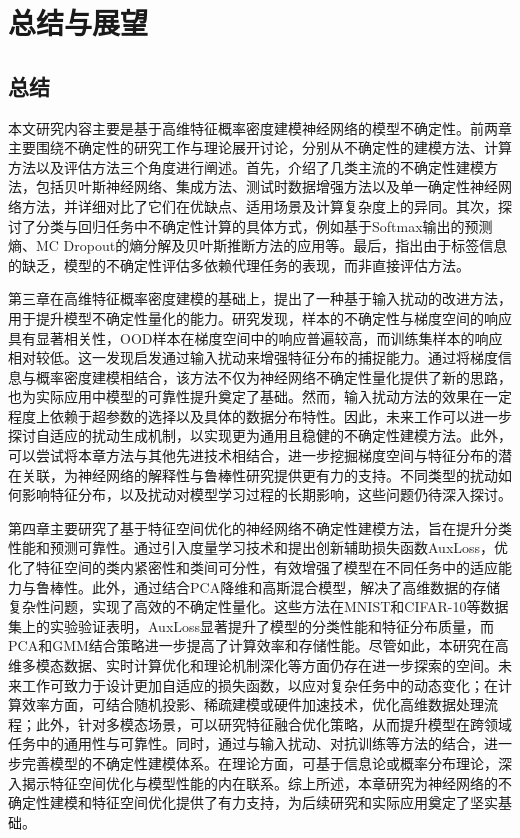 \chapter{总结与展望}
\section{总结}
本文研究内容主要是基于高维特征概率密度建模神经网络的模型不确定性。前两章主要围绕不确定性的研究工作与理论展开讨论，分别从不确定性的建模方法、计算方法以及评估方法三个角度进行阐述。首先，介绍了几类主流的不确定性建模方法，包括贝叶斯神经网络、集成方法、测试时数据增强方法以及单一确定性神经网络方法，并详细对比了它们在优缺点、适用场景及计算复杂度上的异同。其次，探讨了分类与回归任务中不确定性计算的具体方式，例如基于Softmax输出的预测熵、MC Dropout的熵分解及贝叶斯推断方法的应用等。最后，指出由于标签信息的缺乏，模型的不确定性评估多依赖代理任务的表现，而非直接评估方法。

第三章在高维特征概率密度建模的基础上，提出了一种基于输入扰动的改进方法，用于提升模型不确定性量化的能力。研究发现，样本的不确定性与梯度空间的响应具有显著相关性，OOD样本在梯度空间中的响应普遍较高，而训练集样本的响应相对较低。这一发现启发通过输入扰动来增强特征分布的捕捉能力。通过将梯度信息与概率密度建模相结合，该方法不仅为神经网络不确定性量化提供了新的思路，也为实际应用中模型的可靠性提升奠定了基础。然而，输入扰动方法的效果在一定程度上依赖于超参数的选择以及具体的数据分布特性。因此，未来工作可以进一步探讨自适应的扰动生成机制，以实现更为通用且稳健的不确定性建模方法。此外，可以尝试将本章方法与其他先进技术相结合，进一步挖掘梯度空间与特征分布的潜在关联，为神经网络的解释性与鲁棒性研究提供更有力的支持。不同类型的扰动如何影响特征分布，以及扰动对模型学习过程的长期影响，这些问题仍待深入探讨。

第四章主要研究了基于特征空间优化的神经网络不确定性建模方法，旨在提升分类性能和预测可靠性。通过引入度量学习技术和提出创新辅助损失函数AuxLoss，优化了特征空间的类内紧密性和类间可分性，有效增强了模型在不同任务中的适应能力与鲁棒性。此外，通过结合PCA降维和高斯混合模型，解决了高维数据的存储复杂性问题，实现了高效的不确定性量化。这些方法在MNIST和CIFAR-10等数据集上的实验验证表明，AuxLoss显著提升了模型的分类性能和特征分布质量，而PCA和GMM结合策略进一步提高了计算效率和存储性能。尽管如此，本研究在高维多模态数据、实时计算优化和理论机制深化等方面仍存在进一步探索的空间。未来工作可致力于设计更加自适应的损失函数，以应对复杂任务中的动态变化；在计算效率方面，可结合随机投影、稀疏建模或硬件加速技术，优化高维数据处理流程；此外，针对多模态场景，可以研究特征融合优化策略，从而提升模型在跨领域任务中的通用性与可靠性。同时，通过与输入扰动、对抗训练等方法的结合，进一步完善模型的不确定性建模体系。在理论方面，可基于信息论或概率分布理论，深入揭示特征空间优化与模型性能的内在联系。综上所述，本章研究为神经网络的不确定性建模和特征空间优化提供了有力支持，为后续研究和实际应用奠定了坚实基础。

